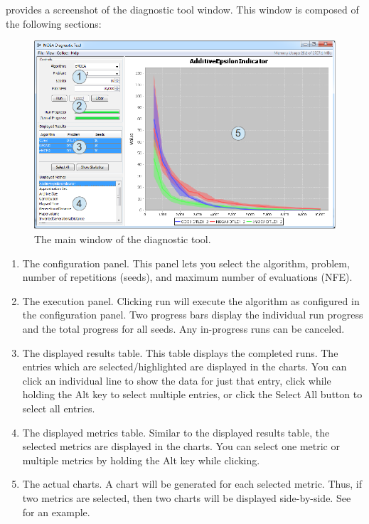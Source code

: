  provides a screenshot of the diagnostic tool window.  This window is composed of the following sections:

\begin{figure}
  \includegraphics[width=\linewidth]{diagnosticToolAnnotated.png}
  \caption{The main window of the diagnostic tool.}
  \label{fig:diagnosticToolAnnotated}
\end{figure}

\begin{enumerate}
  \item The configuration panel.  This panel lets you select the algorithm, problem, number of repetitions (seeds), and maximum number of evaluations (NFE).
  \item The execution panel.  Clicking run will execute the algorithm as configured in the configuration panel.  Two progress bars display the individual run progress and the total progress for all seeds.  Any in-progress runs can be canceled.
  \item The displayed results table.  This table displays the completed runs.  The entries which are selected/highlighted are displayed in the charts.  You can click an individual line to show the data for just that entry, click while holding the Alt key to select multiple entries, or click the Select All button to select all entries.
  \item The displayed metrics table.  Similar to the displayed results table, the selected metrics are displayed in the charts.  You can select one metric or multiple metrics by holding the Alt key while clicking.
  \item The actual charts.  A chart will be generated for each selected metric.  Thus, if two metrics are selected, then two charts will be displayed side-by-side.  See  for an example.
\end{enumerate}

